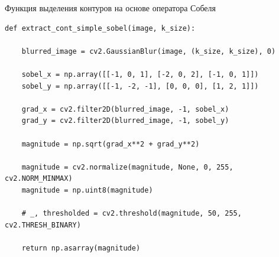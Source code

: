 \documentclass[14pt, russian]{scrartcl}
\begin{document}
\begin{listing}[H]
    \caption{Функция выделения контуров на основе оператора Собеля}
    \label{lst:contour_extr_sobel}
    \begin{verbatim}
def extract_cont_simple_sobel(image, k_size):

    blurred_image = cv2.GaussianBlur(image, (k_size, k_size), 0)

    sobel_x = np.array([[-1, 0, 1], [-2, 0, 2], [-1, 0, 1]])
    sobel_y = np.array([[-1, -2, -1], [0, 0, 0], [1, 2, 1]])

    grad_x = cv2.filter2D(blurred_image, -1, sobel_x)
    grad_y = cv2.filter2D(blurred_image, -1, sobel_y)

    magnitude = np.sqrt(grad_x**2 + grad_y**2)

    magnitude = cv2.normalize(magnitude, None, 0, 255, cv2.NORM_MINMAX)
    magnitude = np.uint8(magnitude)

    # _, thresholded = cv2.threshold(magnitude, 50, 255, cv2.THRESH_BINARY)

    return np.asarray(magnitude)
    \end{verbatim}
\end{listing}
\end{document}
